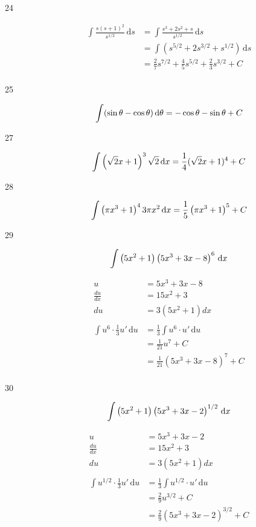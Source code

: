 \documentclass{exam}
\begin{document}
\begin{description}
\item[24]
\begin{align*}
  \int \frac{s(s+1)^2}{s^{1/2}} \, \mathrm{d}s &= \int \frac{s^3 + 2s^2 + s}{s^{1/2}} \, \mathrm{d}s \\
  &= \int \left( s^{5/2} + 2s^{3/2} + s^{1/2} \right) \, \mathrm{d}s \\
  &= \frac{2}{7} s^{7/2} + \frac{4}{5} s^{5/2} + \frac{2}{3} s^{3/2} + C \\
\end{align*}

\item[25]
\[
  \int (\sin \theta - \cos \theta) \, \mathrm{d}\theta = -\cos \theta - \sin \theta + C \\
\]

\item[27]
\[
  \int \left( \sqrt{2} x + 1 \right)^3 \sqrt{2} \, \mathrm{d}x = \frac{1}{4} (\sqrt{2} x + 1)^4 + C \\
\]

\item[28]
\[
  \int \left( \pi x^3 + 1 \right)^4 3 \pi x^2 \, \mathrm{d}x = \frac{1}{5} \left( \pi x^3 + 1 \right)^5 + C \\
\]

\item[29]
\[
  \int \left( 5x^2 + 1 \right) \left(5x^3 + 3x - 8 \right)^6 \, \mathrm{d}x \\
\]

\begin{align*}
  u &= 5x^3 + 3x - 8 \\
  \frac{du}{dx} &= 15x^2 + 3 \\
  du &= 3(5x^2 + 1) dx \\
  \\
  \int u^6 \cdot \frac{1}{3} u' \, \mathrm{d}u &= \frac{1}{3} \int u^6 \cdot  u' \, \mathrm{d}u \\
  &= \frac{1}{21} u^7 + C \\
  &= \frac{1}{21} \left( 5x^3 + 3x - 8 \right)^7 + C \\
\end{align*}

\pagebreak

\item[30]
\[
  \int \left( 5x^2 + 1 \right) \left( 5x^3 + 3x - 2 \right)^{1/2} \, \mathrm{d}x  \\
\]

\begin{align*}
  u &= 5x^3 + 3x - 2 \\
  \frac{du}{dx} &= 15x^2 + 3 \\
  du &= 3(5x^2 + 1) dx \\
  \\
  \int u^{1/2} \cdot \frac{1}{3} u' \, \mathrm{d}u &= \frac{1}{3} \int u^{1/2} \cdot  u' \, \mathrm{d}u \\
  &= \frac{2}{9} u^{3/2} + C \\
  &= \frac{2}{9} \left( 5x^3 + 3x - 2 \right)^{3/2} + C \\
\end{align*}



\end{description}
\end{document}
